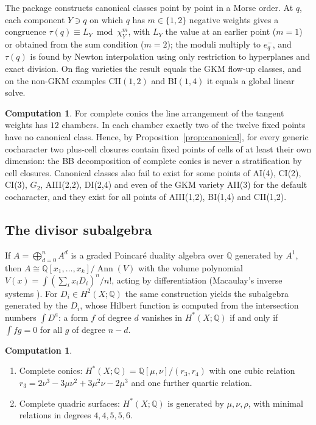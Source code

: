 \documentclass[11pt]{amsart}
\theoremstyle{definition}
\newtheorem{computation}[theorem]{Computation}
\theoremstyle{remark}
\newcommand{\QQ}{\mathbb{Q}}
\DeclareMathOperator{\Ann}{Ann}
\begin{document}
The package constructs canonical classes point by point in a Morse order.
At $q$, each component $Y\ni q$ on which $q$ has $m\in\{1,2\}$ negative weights
gives a congruence $\tau(q)\equiv L_Y\bmod\chi_Y^m$, with $L_Y$ the value at an
earlier point ($m=1$) or obtained from the sum condition ($m=2$); the
moduli multiply to $e^-_q$, and $\tau(q)$ is found by Newton interpolation
using only restriction to hyperplanes and exact division. On flag varieties
the result equals the GKM flow-up classes, and on the non-GKM examples
CII$(1,2)$ and BI$(1,4)$ it equals a global linear solve.

\begin{computation}\label{comp:nocanonical}
For complete conics the line arrangement of the tangent weights has $12$
chambers. In each chamber exactly two of the twelve fixed points have no
canonical class. Hence, by Proposition~\ref{prop:canonical}, for every
generic cocharacter two plus-cell closures contain fixed points of cells
of at least their own dimension: the BB decomposition of complete conics is
never a stratification by cell closures. Canonical classes also fail to exist
for some points of AI(4), CI(2), CI(3), $G_2$, AIII(2,2), DI(2,4) and even of
the GKM variety AII(3) for the default cocharacter, and they exist for all
points of AIII(1,2), BI(1,4) and CII(1,2).
\end{computation}

\subsection{The divisor subalgebra}
If $A = \bigoplus_{d=0}^n A^d$ is a graded Poincar\'e duality algebra over
$\QQ$ generated by $A^1$, then $A\cong\QQ[x_1,\dots,x_k]/\Ann(V)$ with the
volume polynomial $V(x) = \int(\sum_i x_iD_i)^n/n!$, acting by
differentiation (Macaulay's inverse systems \cite{Macaulay}). For
$D_i\in H^2(X;\QQ)$ the same construction yields the subalgebra generated by
the $D_i$, whose Hilbert function is computed from the intersection numbers
$\int D^a$: a form $f$ of degree $d$ vanishes in $H^*(X;\QQ)$ if and only if
$\int fg=0$ for all $g$ of degree $n-d$.

\begin{computation}\label{comp:divisors}
\begin{enumerate}
\item Complete conics: $H^*(X;\QQ)=\QQ[\mu,\nu]/(r_3,r_4)$ with one cubic
relation $r_3 = 2\nu^3-3\mu\nu^2+3\mu^2\nu-2\mu^3$ and one further quartic
relation.
\item Complete quadric surfaces: $H^*(X;\QQ)$ is generated by $\mu,\nu,\rho$,
with minimal relations in degrees $4,4,5,5,6$.
\end{enumerate}
\end{computation}
\end{document}
